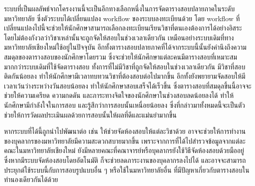 ระบบที่เป็นผลลัพธ์จากโครงงานนี้จะเป็นอีกทางเลือกหนึ่งในการจัดตารางสอบปลายภาคในระดับมหาวิทยาลัย
ซึ่งตัวระบบได้เปลี่ยนแปลง workflow ของระบบลงทะเบียนด้วย โดย workflow ที่เปลี่ยนแปลงไปนี้จะช่วยให้นักศึกษาสามารถเลือกลงทะเบียนเรียนวิชาที่ตนเองต้องการได้อย่างอิสระ 
โดยไม่ต้องกังวลว่าวิชาเหล่านั้นจะถูกจัดให้สอบในช่วงเวลาเดียวกัน เหมือนอย่างระบบเดิมที่ทางมหาวิทยาลัยเชียงใหม่ใช้อยู่ในปัจจุบัน
อีกทั้งตารางสอบปลายภาคที่ได้จากระบบนี้นั้นยังคำนึงถึงความสมดุลของตารางสอบของนักศึกษาโดยรวม ซึ่งจะช่วยให้นักศึกษาแต่ละคนมีตารางสอบที่เหมาะสมมากกว่าระบบเดิมที่ใช้จัดตารางสอบ
ทั้งการที่ไม่มีวิชาที่ถูกจัดให้สอบในช่วงเวลาเดียวกัน มีวิชาที่สอบติดกันน้อยลง ทำให้นักศึกษามีเวลาทบทวนวิชาที่ต้องสอบต่อไปมากขึ้น อีกทั้งยังพยายามจัดสอบให้มีเวลาเว้นว่างระหว่างวันสอบน้อยลง
ทำให้นักศึกษาสอบเสร็จได้เร็วขึ้น ซึ่งตารางสอบที่สมดุลขึ้นนี้อาจจะช่วยให้ความเครียด ความกดดัน และภาระทางจิตใจของนักศึกษาในช่วงสอบลดน้อยลงได้ ทำให้นักศึกษามีกำลังใจในการสอบ และรู้สึกว่าการสอบนั้นเหนื่อยน้อยลง
ซึ่งที่กล่าวมาทั้งหมดนี้จะเป็นตัวช่วยให้การวัดผลประเมินผลด้วยการสอบนั้นให้ผลที่ดีและแม่นยำมากขึ้น


หากระบบที่ได้นี้ถูกนำไปพัฒนาต่อ เช่น ให้ช่วยจัดห้องสอบให้แต่ละวิชาด้วย อาจจะช่วยให้การทำงานของบุคลากรของมหาวิทยาลัยมีความสะดวกสบายมากขึ้น 
เพราะจากการที่ได้ไปสำรวจข้อมูลจากแต่ละคณะในมหาวิทยาลัยเชียงใหม่ ยังมีหลายคณะที่คณาจารย์หรือบุคลากรยังใช้วิธีจัดห้องสอบด้วยมืออยู่ 
ซึ่งหากมีระบบจัดห้องสอบโดยอัตโนมัติ ก็จะช่วยลดภาระงานของบุคลากรลงไปได้ และอาจจะสามารถประยุกต์ใช้ระบบนี้กับการสอบรูปแบบอื่น ๆ หรือใช้ในมหาวิทยาลัยอื่น ที่มีปัญหาเกี่ยวกับตารางสอบในทำนองเดียวกันได้ด้วย
